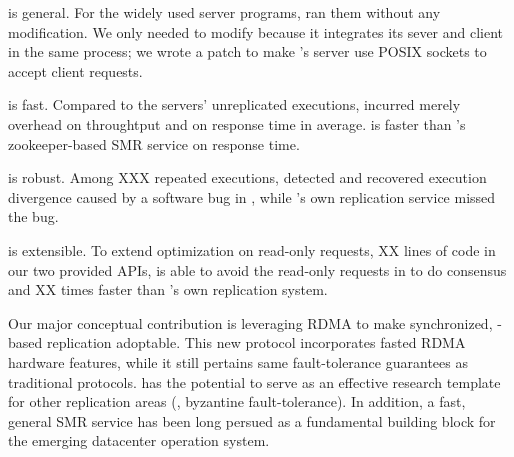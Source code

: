 \begin{tightenum}
\item \xxx is general. For the \npopularprog widely used server programs, \xxx 
ran them without any modification. We only needed to modify \calvin because it 
integrates its sever and client in the same process; we wrote a \nlinescalvin 
patch to make \calvin's server use POSIX sockets to accept client requests.

\item \xxx is fast. Compared to the \nprog servers' unreplicated executions, 
\xxx incurred merely \tputoverhead overhead on throughtput and \latencyoverhead 
on response time in average. \xxx is \fasterthanzookeeper faster than \calvin's 
zookeeper-based SMR service on response time.

\item \xxx is robust. Among XXX repeated executions, \xxx detected and 
recovered execution divergence caused by a software bug in \redis, while 
\redis's own replication service missed the bug.

\item \xxx is extensible. To extend optimization on read-only requests, XX 
lines of code in our two provided APIs, \xxx is able to avoid the read-only 
requests in \redis to do consensus and XX times faster than \redis's own 
replication system. 

\end{tightenum}  

Our major conceptual contribution is leveraging RDMA to make synchronized, 
\paxos-based replication adoptable. This new protocol incorporates fasted RDMA 
hardware features, while it still pertains same fault-tolerance guarantees as 
traditional \paxos protocols. \xxx has the potential to serve as an effective 
research template for other replication areas (\eg, byzantine fault-tolerance). 
In addition, a fast, general SMR service has been long persued as a fundamental 
building block for the emerging datacenter operation system.

